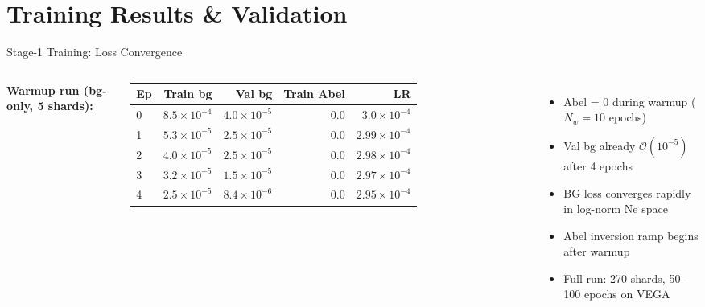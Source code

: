 \documentclass[aspectratio=169,10pt]{beamer}
\begin{document}
\section{Training Results \& Validation}

\begin{frame}{Stage-1 Training: Loss Convergence}
\begin{columns}
\scriptsize
\textbf{Warmup run (bg-only, 5 shards):}
\begin{tabular}{lrrrr}
\toprule
Ep & Train bg & Val bg & Train Abel & LR\\
\midrule
0 & $8.5\times10^{-4}$ & $4.0\times10^{-5}$ & 0.0 & $3.0\times10^{-4}$ \\
1 & $5.3\times10^{-5}$ & $2.5\times10^{-5}$ & 0.0 & $2.99\times10^{-4}$ \\
2 & $4.0\times10^{-5}$ & $2.5\times10^{-5}$ & 0.0 & $2.98\times10^{-4}$ \\
3 & $3.2\times10^{-5}$ & $1.5\times10^{-5}$ & 0.0 & $2.97\times10^{-4}$ \\
4 & $2.5\times10^{-5}$ & $8.4\times10^{-6}$ & 0.0 & $2.95\times10^{-4}$ \\
\bottomrule
\end{tabular}
\vspace{3pt}
\begin{itemize}\tiny
  \item Abel = 0 during warmup ($N_w = 10$ epochs)
  \item Val bg already $\mathcal{O}(10^{-5})$ after 4 epochs
  \item BG loss converges rapidly in log-norm Ne space
  \item Abel inversion ramp begins after warmup
  \item Full run: 270 shards, 50--100 epochs on VEGA
\end{itemize}


\end{columns}
\end{frame}
\end{document}
